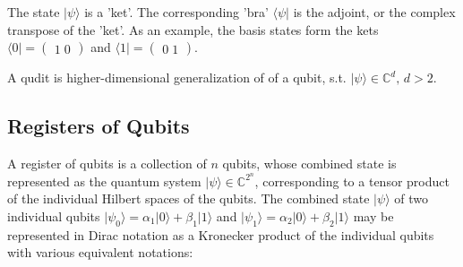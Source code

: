 \documentclass{article}
\begin{document}
The state $ \lvert \psi \rangle $ is a 'ket'. The corresponding 'bra'  $\langle \psi \rvert$ is the adjoint, or the complex transpose of the 'ket'. As an example, the basis states form the kets
 $ \langle 0 \rvert =  \begin{pmatrix}
1 \; 0
\end{pmatrix} $
 and 
$\langle 1 \rvert =  \begin{pmatrix}
0 \; 1
\end{pmatrix} $.

A qudit is higher-dimensional generalization of of a qubit, s.t. $ \lvert \psi \rangle \in \mathbb{C}^d , \, d>2$.



\subsection{Registers of Qubits}

A register of qubits is a collection of $ n $ qubits, whose combined state is represented as the quantum system $ \lvert \psi \rangle \in  \mathbb{C}^{2^{n}}$, corresponding to a tensor product of the individual Hilbert spaces of the qubits.  The combined state $ \lvert \psi  \rangle $ of two individual qubits $ \lvert \psi _ 0 \rangle = \alpha_1 \lvert 0 \rangle + \beta_1 \lvert 1 \rangle $ and $ \lvert \psi _ 1 \rangle = \alpha_2 \lvert 0 \rangle + \beta_2 \lvert 1 \rangle $ may be represented in Dirac notation as a Kronecker product of the individual qubits with various equivalent notations:
\end{document}
